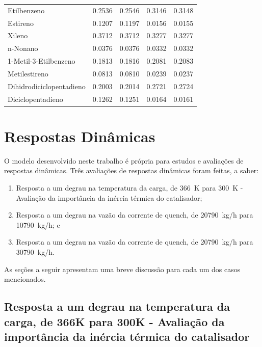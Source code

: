 \begin{table}[!htb]
\begin{center}
\begin{tabular}{lcccc}
{Etilbenzeno} & \num{0,2536} & \num{0,2546} & \num{0,3146} & \num{0,3148} \\
{Estireno} & \num{0,1207} & \num{0,1197} & \num{0,0156} & \num{0,0155} \\
{Xileno} & \num{0,3712} & \num{0,3712} & \num{0,3277} & \num{0,3277} \\
{n-Nonano} & \num{0,0376} & \num{0,0376} & \num{0,0332} & \num{0,0332} \\
{1-Metil-3-Etilbenzeno} & \num{0,1813} & \num{0,1816} & \num{0,2081} &
\num{0,2083}
\\
{Metilestireno} & \num{0,0813} & \num{0,0810} & \num{0,0239} & \num{0,0237} \\
{Dihidrodiciclopentadieno} & \num{0,2003} & \num{0,2014} & \num{0,2721} &
\num{0,2724} \\
{Diciclopentadieno} & \num{0,1262} & \num{0,1251} & \num{0,0164} & \num{0,0161}
\\
\bottomrule
\end{tabular}
\end{center}
\end{table}

\section{Respostas Dinâmicas} \label{sec:respostasdinamicas}

O modelo desenvolvido neste trabalho é própria para estudos e
avaliações de respostas dinâmicas. Três avaliações de respostas dinâmicas foram
feitas, a saber:

\begin{enumerate}
  \item Resposta a   um degrau na temperatura da carga, de \SI{366}{K} para
  \SI{300}{K} - Avaliação da importância da inércia térmica do catalisador;
  \item Resposta a um degrau na vazão da corrente de quench, de \SI{20790}{kg/h}
  para \SI{10790}{kg/h}; e
  \item Resposta a um degrau na vazão da corrente de quench, de \SI{20790}{kg/h}
  para \SI{30790}{kg/h}.
\end{enumerate}

As seções a seguir apresentam uma breve discussão para cada um dos casos
mencionados.

\subsection{Resposta a   um degrau na temperatura da carga, de \si{366}{K} para
\si{300}{K} - Avaliação da importância da inércia térmica do catalisador}
\label{sec:respostaaumdegrautemp}


